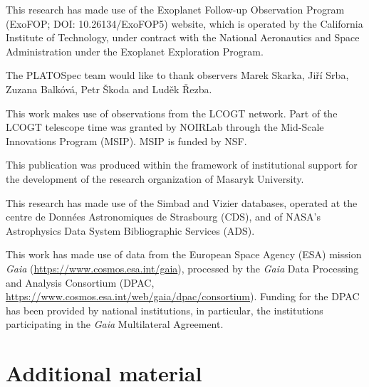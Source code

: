 \documentclass[traditabstract,longauth]{aa}
\begin{document}
\begin{acknowledgements}

This research has made use of the Exoplanet Follow-up Observation Program (ExoFOP; DOI: 10.26134/ExoFOP5) website, which is operated by the California Institute of Technology, under contract with the National Aeronautics and Space Administration under the Exoplanet Exploration Program.

The PLATOSpec team would like to thank observers Marek Skarka, Ji\v{r}\'{i} Srba, Zuzana Balk\'{o}v\'{a}, Petr \v{S}koda and Lud\v{e}k \v{R}ezba.

This work makes use of observations from the LCOGT network. Part of the LCOGT telescope time was granted by NOIRLab through the Mid-Scale Innovations Program (MSIP). MSIP is funded by NSF.

This publication was produced within the framework of institutional support for the development of the research organization of Masaryk University.

This research has made use of the Simbad and Vizier databases, operated at the centre de Donn\'ees Astronomiques de Strasbourg (CDS), and of NASA's Astrophysics Data System Bibliographic Services (ADS).

This work has made use of data from the European Space Agency (ESA) mission {\it Gaia} (\url{https://www.cosmos.esa.int/gaia}), processed by the {\it Gaia} Data Processing and Analysis Consortium (DPAC, \url{https://www.cosmos.esa.int/web/gaia/dpac/consortium}). Funding for the DPAC
has been provided by national institutions, in particular, the institutions participating in the {\it Gaia} Multilateral Agreement.
\end{acknowledgements}



\onecolumn
\appendix
\renewcommand\thefigure{\thesection.\arabic{figure}}    
\section{Additional material}
\end{document}
